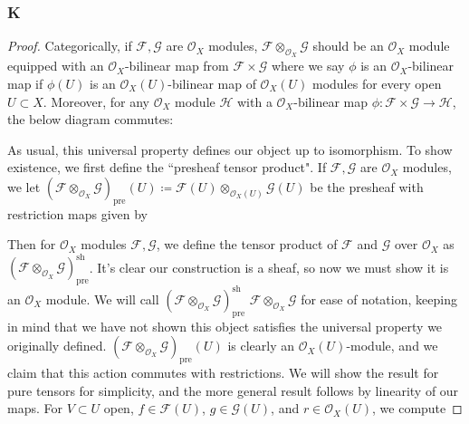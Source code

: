 \documentclass{article}
\newcommand{\fO}{\mathscr{O}}
\newcommand{\fF}{\mathscr{F}}
\newcommand{\fG}{\mathscr{G}}
\newcommand{\fH}{\mathscr{H}}
\DeclareMathOperator{\pre}{pre}
\DeclareMathOperator{\res}{res}
\DeclareMathOperator{\sh}{sh}
\begin{document}
\subsubsection{K}\label{2.6.K}
\begin{proof}
    Categorically, if $\fF, \fG$ are $\fO_X$ modules, $\fF \otimes_{\fO_X} \fG$ should be an $\fO_X$ module equipped with an $\fO_X$-bilinear map from $\fF\times \fG$ where we say $\phi$ is an $\fO_X$-bilinear map if $\phi(U)$ is an $\fO_X(U)$-bilinear map of $\fO_X(U)$ modules for every open $U\subset X$. Moreover, for any $\fO_X$ module $\fH$ with a $\fO_X$-bilinear map $\phi:\fF\times \fG \to \fH$, the below diagram commutes:
    \begin{center}
    \end{center}
    As usual, this universal property defines our object up to isomorphism. To show existence, we first define the ``presheaf tensor product". If $\fF, \fG$ are $\fO_X$ modules, we let $(\fF \otimes_{\fO_X} \fG)_{\pre}(U)\coloneqq \fF(U) \otimes_{\fO_X(U)} \fG(U)$ be the presheaf with restriction maps given by
    \begin{center}
    \end{center}
    Then for $\fO_X$ modules $\fF, \fG$, we define the tensor product of $\fF$ and $\fG$ over $\fO_X$ as $(\fF\otimes_{\fO_X} \fG)_{\pre}^{\sh}$. It's clear our construction is a sheaf, so now we must show it is an $\fO_X$ module. We will call $(\fF \otimes_{\fO_X} \fG)_{\pre}^{\sh}$ $\fF\otimes_{\fO_X} \fG$ for ease of notation, keeping in mind that we have not shown this object satisfies the universal property we originally defined. $(\fF \otimes_{\fO_X} \fG)_{\pre}(U)$ is clearly an $\fO_X(U)$-module\iffalse, and we claim that this action commutes with restrictions. We will show the result for pure tensors for simplicity, and the more general result follows by linearity of our maps. For $V\subset U$ open, $f\in \fF(U)$, $g\in \fG(U)$, and $r\in \fO_X(U)$, we compute

\end{proof}
\end{document}
